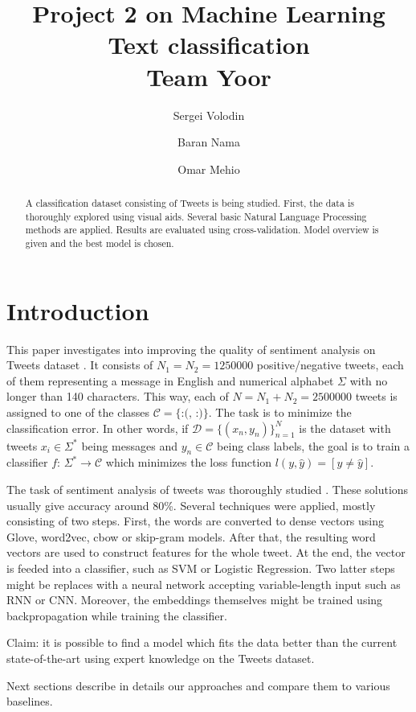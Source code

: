 \documentclass[10pt,conference,compsocconf]{IEEEtran}
\title{Project 2 on Machine Learning\\Text classification\\Team Yoor}
\author[1]{Sergei Volodin}
\author[1]{Baran Nama}
\author[1]{Omar Mehio}
\affil[1]{EPFL}
\affil[ ]{\textit {\{sergei.volodin,baran.nama,omar.mehio\}@epfl.ch}}
\begin{document}
\maketitle

\begin{abstract}
A classification dataset consisting of Tweets is being studied. First, the data is thoroughly explored using visual aids. Several basic Natural Language Processing methods are applied. Results are evaluated using cross-validation. Model overview is given and the best model is chosen.
\end{abstract}

\section{Introduction}
This paper investigates into improving the quality of sentiment analysis on Tweets dataset \cite{kaggle}.
It consists of $N_1=N_2=1250000$ positive/negative tweets, each of them representing a message in English and numerical alphabet $\Sigma$ with no longer than 140 characters.
This way, each of $N=N_1+N_2=2500000$ tweets is assigned to one of the classes $\mathcal{C}=\{\mbox{:(},\,\mbox{:)}\}$.
The task is to minimize the classification error.
In other words, if $\mathcal{D}=\{(x_n, y_n)\}_{n=1}^N$ is the dataset with tweets $x_i\in\Sigma^*$ being messages and $y_n\in \mathcal{C}$ being class labels, the goal is to train a classifier $f\colon\, \Sigma^*\to\mathcal{C}$ which minimizes the loss function $l(y,\hat{y})=[y\neq \hat{y}]$.

The task of sentiment analysis of tweets was thoroughly studied \cite{sota1, sota2, sota3, sota4}. These solutions usually give accuracy around 80\%.
Several techniques were applied, mostly consisting of two steps.
First, the words are converted to dense vectors using Glove, word2vec, cbow or skip-gram models.
After that, the resulting word vectors are used to construct features for the whole tweet.
At the end, the vector is feeded into a classifier, such as SVM or Logistic Regression.
Two latter steps might be replaces with a neural network accepting variable-length input such as RNN or CNN.
Moreover, the embeddings themselves might be trained using backpropagation while training the classifier.

Claim: it is possible to find a model which fits the data better than the current state-of-the-art using expert knowledge on the Tweets dataset.

Next sections describe in details our approaches and compare them to various baselines.
\end{document}
